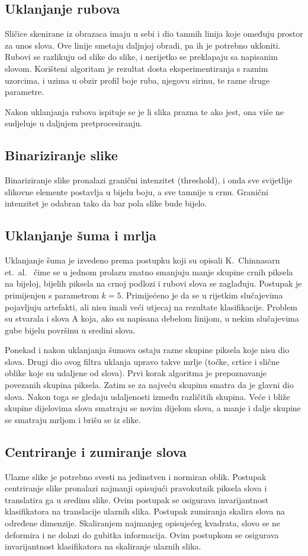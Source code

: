\documentclass[a4paper,twocolumn,dvipdfm]{article}
\begin{document}
\subsection{Uklanjanje rubova}
Sličice skenirane iz obrazaca imaju u sebi i dio tamnih linija koje omeđuju prostor za unos slova.
Ove linije smetaju daljnjoj obradi, pa ih je potrebno ukloniti.
Rubovi se razlikuju od slike do slike, i nerijetko se preklapaju sa napisanim slovom.
Korišteni algoritam je rezultat dosta eksperimentiranja s raznim uzorcima, i uzima u obzir profil boje ruba, njegovu sirinu, te razne druge parametre.

Nakon uklanjanja rubova ispituje se je li slika prazna te ako jest, ona više ne sudjeluje u daljnjem pretprocesiranju.

\subsection{Binariziranje slike}
Binariziranje slike pronalazi granični intenzitet (threshold), i onda sve svijetlije slikovne elemente postavlja u bijelu boju, a sve tamnije u crnu.
Granični intenzitet je odabran tako da bar pola slike bude bijelo.

\subsection{Uklanjanje šuma i mrlja}
Uklanjanje šuma je izvedeno prema postupku koji su opisali K.\ Chinnasarn et.\
al.\ \cite{chinnasarn2002removing} čime se u jednom prolazu znatno smanjuju
manje skupine crnih piksela na bijeloj, bijelih piksela na crnoj podlozi i
rubovi slova se zaglađuju. Postupak je primijenjen s parametrom $k = 5$.
Primijećeno je da se u rijetkim slučajevima pojavljuju artefakti, ali nisu imali
veći utjecaj na rezultate klasifikacije. Problem su stvarala i slova A koja, ako
su napisana debelom linijom, u nekim slučajevima gube bijelu površinu u sredini
slova.

Ponekad i nakon uklanjanja šumova ostaju razne skupine piksela koje nisu dio
slova. Drugi dio ovog filtra uklanja upravo takve mrlje (točke, crtice i slične
oblike koje su udaljene od slova). Prvi korak algoritma je prepoznavanje
povezanih skupina piksela. Zatim se za najveću skupinu smatra da je glavni dio
slova. Nakon toga se gledaju udaljenosti između različitih skupina. Veće i
bliže skupine dijelovima slova smatraju se novim dijelom slova, a manje i dalje
skupine se smatraju mrljom i brišu se iz slike.

\subsection{Centriranje i zumiranje slova}
Ulazne slike je potrebno svesti na jedinstven i normiran oblik. Postupak 
centriranje slike pronalazi najmanji opisujući pravokutnik piksela slova  
i translatira ga u sredinu slike. Ovim postupak se osigurava invarijantnost
klasifikatora na translacije ulaznih slika. Postupak zumiranja skalira slova 
na određene dimenzije. Skaliranjem najmanjeg opisujećeg kvadrata, slovo se 
ne deformira i ne dolazi do gubitka informacija. Ovim postupkom se osigurava 
invarijantnost klasifikatora na skaliranje ulaznih slika.
\end{document}
